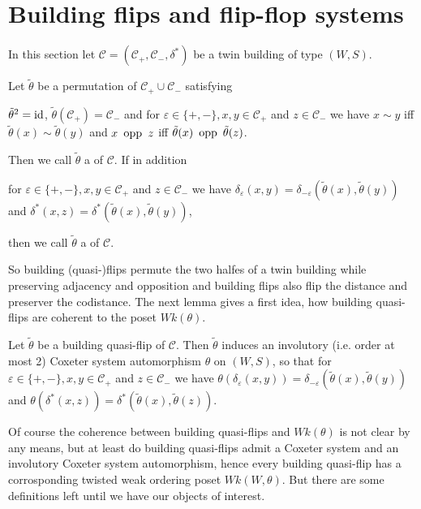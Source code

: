 \section{Building flips and flip-flop systems}
In this section let $\mathcal C = (\mathcal C_+, \mathcal C_-, \delta^*)$ be a twin building of type $(W,S)$.

\begin{defi}
	Let $\tilde \theta$ be a permutation of $\mathcal C_+ \cup \mathcal C_-$ satisfying
	\begin{axioms}
		 $\tilde \theta^2 = \operatorname{id}$,
		 $\tilde \theta(\mathcal C_+) = \mathcal C_-$ and
		 for $\varepsilon \in \{+,-\}, x,y \in \mathcal C_+$ and $z \in \mathcal C_-$ we have $x \sim y$ iff $\tilde \theta(x) \sim \tilde \theta(y)$ and $x \opp z$ iff $\tilde \theta(x) \opp \tilde \theta(z)$.
	\end{axioms}
	Then we call $\tilde \theta$ a  of $\mathcal{C}$. If in addition
	\begin{axioms}
		 for $\varepsilon \in \{+,-\}, x,y \in \mathcal C_+$ and $z \in \mathcal C_-$ we have $\delta_\varepsilon(x,y) = \delta_{-\varepsilon}(\tilde \theta(x),\tilde \theta(y))$ and $\delta^*(x,z) = \delta^*(\tilde \theta(x),\tilde \theta(y))$, 
	\end{axioms}
	then we call $\tilde \theta$ a  of $\mathcal C$.
\end{defi}

So building (quasi-)flips permute the two halfes of a twin building while preserving adjacency and opposition and building flips also flip the distance and preserver the codistance. The next lemma gives a first idea, how building quasi-flips are coherent to the poset $Wk(\theta)$.

\begin{lemm}
	Let $\tilde \theta$ be a building quasi-flip of $\mathcal C$. Then $\tilde \theta$ induces an involutory (i.e. order at most 2) Coxeter system automorphism $\theta$ on $(W,S)$, so that for $\varepsilon \in \{+,-\}, x,y \in \mathcal C_+$ and $z \in \mathcal C_-$ we have $\theta(\delta_\varepsilon(x,y)) = \delta_{-\varepsilon}(\tilde \theta(x), \tilde \theta(y))$ and $\theta(\delta^*(x,z)) = \delta^*(\tilde \theta(x), \tilde \theta(z))$.
\end{lemm}

Of course the coherence between building quasi-flips and $Wk(\theta)$ is not clear by any means, but at least do building quasi-flips admit a Coxeter system and an involutory Coxeter system automorphism, hence every building quasi-flip has a corrosponding twisted weak ordering poset $Wk(W,\theta)$. But there are some definitions left until we have our objects of interest.

